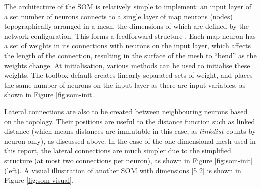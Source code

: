 \documentclass[10pt, oneside]{article}
\begin{document}
The architecture of the SOM is relatively simple to implement: an input layer of a set number of neurons connects to a single layer of map neurons (nodes) topographically arranged in a mesh, the dimensions of which are defined by the network configuration. This forms a feedforward structure \cite[p. 429]{haykin2008}. Each map neuron has a set of weights in its connections with neurons on the input layer, which affects the length of the connection, resulting in the surface of the mesh to ``bend'' as the weights change. At initialisation, various methods can be used to initialise these weights. The toolbox default creates linearly separated sets of weight, and places the same number of neurons on the input layer as there are input variables, as shown in Figure \ref{fig:som-init}.

Lateral connections are also to be created between neighbouring neurons based on the topology. Their positions are useful to the distance function such as linked distance (which means distances are immutable in this case, as $linkdist$ counts by neuron only), as discussed above. In the case of the one-dimensional mesh used in this report, the lateral connections are much simpler due to the simplified structure (at most two connections per neuron), as shown in Figure \ref{fig:som-init} (left). A visual illustration of another SOM with dimensions [5 2] is shown in Figure \ref{fig:som-visual}.
\end{document}
